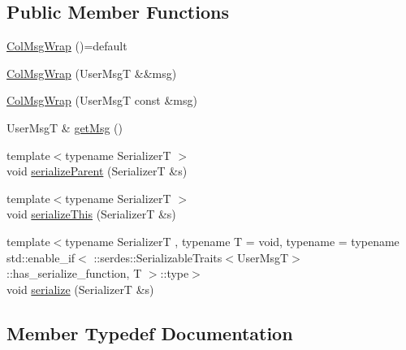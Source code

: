 \subsection*{Public Member Functions}
\begin{DoxyCompactItemize}
\item 
\hyperlink{structvt_1_1vrt_1_1collection_1_1_col_msg_wrap_a341d1ea25fb9181d1c06ab66df1478f9}{Col\+Msg\+Wrap} ()=default
\item 
\hyperlink{structvt_1_1vrt_1_1collection_1_1_col_msg_wrap_a9dfc351adf1f31fda9028608d989ce5c}{Col\+Msg\+Wrap} (User\+MsgT \&\&msg)
\item 
\hyperlink{structvt_1_1vrt_1_1collection_1_1_col_msg_wrap_ac19f3573a80a849d41fd5874fe94414a}{Col\+Msg\+Wrap} (User\+MsgT const \&msg)
\item 
User\+MsgT \& \hyperlink{structvt_1_1vrt_1_1collection_1_1_col_msg_wrap_a69d30485a72651a7ede17f6bcdb13cd4}{get\+Msg} ()
\item 
{\footnotesize template$<$typename SerializerT $>$ }\\void \hyperlink{structvt_1_1vrt_1_1collection_1_1_col_msg_wrap_aa9fac3b0fea45495883f2cac5efd79cf}{serialize\+Parent} (SerializerT \&s)
\item 
{\footnotesize template$<$typename SerializerT $>$ }\\void \hyperlink{structvt_1_1vrt_1_1collection_1_1_col_msg_wrap_a1316131ea77469404fbaee6a176e74dc}{serialize\+This} (SerializerT \&s)
\item 
{\footnotesize template$<$typename SerializerT , typename T  = void, typename  = typename std\+::enable\+\_\+if$<$      \+::serdes\+::\+Serializable\+Traits$<$\+User\+Msg\+T$>$\+::has\+\_\+serialize\+\_\+function, T    $>$\+::type$>$ }\\void \hyperlink{structvt_1_1vrt_1_1collection_1_1_col_msg_wrap_ad225439a1358090be0ad57cb536eb1d3}{serialize} (SerializerT \&s)
\end{DoxyCompactItemize}


\subsection{Member Typedef Documentation}
\mbox{\label{structvt_1_1vrt_1_1collection_1_1_col_msg_wrap_a168446c6b2feea3a003dbfa02f21e227}} 

